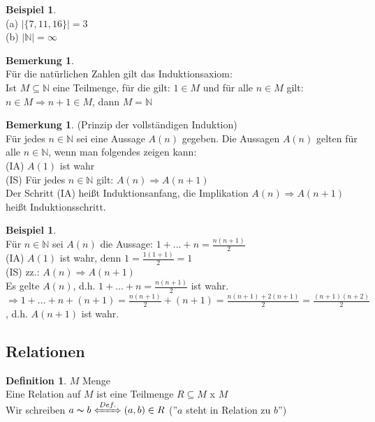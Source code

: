 \documentclass[10pt,a4paper,numbers=endperiod]{scrartcl}
\theoremstyle{definition}
\newtheorem{defi}[satz]{Definition}
\newtheorem{bem}[satz]{Bemerkung}
\newtheorem{bsp}[satz]{Beispiel}
\def\NN{{\mathbb N}}
\begin{document}
\begin{bsp}
	$ $ \\
	(a) $|\{7,11,16\}|=3$\\
	(b) $|\mathbb{N}|= \infty$
\end{bsp}

\begin{bem}
	$ $ \\
	Für die natürlichen Zahlen gilt das Induktionsaxiom:\\
	Ist $M \subseteq \NN$ eine Teilmenge, für die gilt: 
	$1 \in M$ und für alle $n \in M$ gilt: $n \in M \Rightarrow n+1 \in M$, dann $M=\NN$
\end{bem}

\begin{bem}
	(Prinzip der vollständigen Induktion)\\Für jedes $n \in \mathbb{N}$ sei eine Aussage $A(n)$ gegeben. Die Aussagen $A(n)$ gelten für alle $n \in \mathbb{N}$, wenn man folgendes zeigen kann:\\
	(IA) $A(1)$ ist wahr\\
	(IS) Für jedes $n \in \mathbb{N}$ gilt: $A(n) \Rightarrow A(n+1)$\\
	Der Schritt (IA) heißt Induktionsanfang, die Implikation $A(n) \Rightarrow A(n+1)$ heißt Induktionsschritt.
\end{bem}

\begin{bsp}
	$ $ \\
	Für $n \in \mathbb{N}$ sei $A(n)$ die Aussage: $1+...+n=\frac{n(n+1)}{2}$\\
	(IA) $A(1)$ ist wahr, denn $1= \frac{1(1+1)}{2}=1$\\
	(IS) zz.: $A(n) \Rightarrow A(n+1)$\\
	Es gelte $A(n)$, d.h. $1+...+n = \frac{n(n+1)}{2}$ ist wahr. $\Rightarrow 1+...+n+(n+1) = \frac{n(n+1)}{2}+(n+1)=\frac{n(n+1)+2(n+1)}{2}=\frac{(n+1)(n+2)}{2}$, d.h. $A(n+1)$ ist wahr.
\end{bsp}

\subsection{Relationen}

\begin{defi}
	$M$ Menge\\
	Eine Relation auf $M$ ist eine Teilmenge $R \subseteq M$ x $M$\\
	Wir schreiben $a \thicksim b \xLeftrightarrow[]{Def.} (a,b) \in R$ (''$a$ steht in Relation zu $b$'')
\end{defi}
\end{document}
